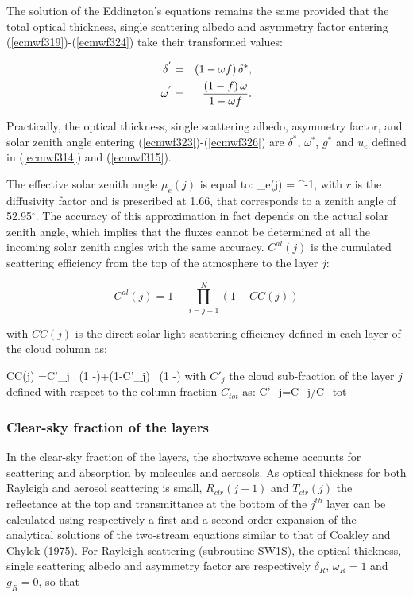 The solution of the Eddington's equations remains the same provided that the total optical thickness, single scattering albedo and asymmetry factor entering (\ref{ecmwf319})-(\ref{ecmwf324}) take their transformed values:

\medskip
\begin{eqnarray}\label{ecmwf326}
\delta^{'} &=& (1 - \omega f) \, \delta^{*}, \cr
\omega^{'}  &=& \frac{(1 - f) \, \omega}{1 - \omega f}.
\end{eqnarray}

Practically, the optical thickness, single scattering albedo, asymmetry factor,
and solar zenith angle entering (\ref{ecmwf323})-(\ref{ecmwf326}) are $\delta^{*}$, $\omega^{*}$, $g^{*}$ and $u_e$ defined in (\ref{ecmwf314}) and (\ref{ecmwf315}).


The effective solar zenith angle $\mu_e(j)$ is equal to:
\medskip
\be
\mu_e(j) = ^{-1},
\label{ecmwf315}
\ee
with $r$ is the diffusivity factor and is prescribed at 1.66, that corresponds to a zenith angle of 52.95$^\circ$. The accuracy of this approximation in fact depends on the actual solar zenith angle, which implies that the fluxes cannot be determined at all the incoming solar zenith angles with the same accuracy. $C^{al}(j)$ is the cumulated scattering efficiency from the top of the atmosphere to the layer $j$:
\noindent

\[
C^{al}(j) = 1 - \prod_{i=j+1}^N{(1 - CC(j))}
\]

\noindent
with $CC(j)$ is the direct solar light scattering efficiency defined in each layer of the cloud column as:

\be
CC(j) =C'_j \, (1 -\exp{})+(1-C'_j) \, (1 -\exp{} )
\label{ecmwf316a}
\ee
\medskip
with $C'_j$ the cloud sub-fraction of the layer $j$
defined with respect to the column fraction $C_{tot}$ as:
\be
C'_j=C_j/C_{tot}		
\ee

%
\subsubsection{Clear-sky fraction of the layers}
%
In the clear-sky fraction of the layers, the shortwave scheme accounts for scattering and absorption by molecules and aerosols. As optical thickness for both Rayleigh and aerosol scattering is small, $R_{clr}(j-1)$ and $T_{clr}(j)$ the reflectance at the top and transmittance at the bottom of the $j^{th}$ layer can be calculated using respectively a first and a second-order expansion of the analytical solutions of the two-stream equations similar to that of Coakley and Chylek (1975). For Rayleigh scattering (subroutine SW1S), the optical thickness, single scattering albedo and asymmetry factor are respectively $\delta_R$, $\omega_R = 1$ and $g_R = 0$, so that

